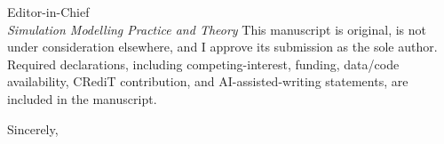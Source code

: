 \documentclass[10pt]{letter}
\begin{document}
\begin{letter}{Editor-in-Chief\\
\emph{Simulation Modelling Practice and Theory}}
This manuscript is original, is not under consideration elsewhere, and I
approve its submission as the sole author. Required declarations, including
competing-interest, funding, data/code availability, CRediT contribution,
and AI-assisted-writing statements, are included in the manuscript.

\closing{Sincerely,}

\end{letter}
\end{document}
